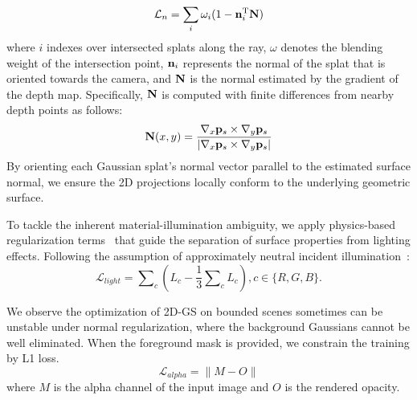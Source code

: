 \begin{equation}
\mathcal{L}_{n} = \sum_{i} \omega_i (1-\bn_i^\mathrm{T}\bN)
\vspace{-1ex}
\end{equation}
where $i$ indexes over intersected splats along the ray, $\omega$ denotes the blending weight of the intersection point, $\mathbf{n}_i$ represents the normal of the splat that is oriented towards the camera, and $\mathbf{N}$ is the normal estimated by the gradient of the depth map. Specifically, $\mathbf{N}$ is computed with finite differences from nearby depth points as follows:
\begin{equation}
\mathbf{N}(x,y) = \frac{\nabla_x \mathbf{p}_s \times \nabla_y \mathbf{p}_s}{|\nabla_x \mathbf{p}_s \times \nabla_y \mathbf{p}_s|}
\label{eq:normal_depth}
\end{equation} 
By orienting each Gaussian splat's normal vector parallel to the estimated surface normal, we ensure the 2D projections locally conform to the underlying geometric surface. 


To tackle the inherent material-illumination ambiguity, we apply physics-based regularization terms~\cite{gao2023relightable} that guide the separation of surface properties from lighting effects. Following the assumption of approximately neutral incident illumination~\cite{liu2023nero}:
\begin{equation}
\label{eq:reg_light}
    \mathcal{L}_{light} = \sum\nolimits_{c}(L_{c} - \frac{1}{3}\sum\nolimits_{c}L_{c}), c\in\{R,G,B\}.
\end{equation}

We observe the optimization of 2D-GS on bounded scenes sometimes can be unstable under normal regularization, where the background Gaussians cannot be well eliminated. When the foreground mask is provided, we constrain the training by L1 loss. 
\begin{equation}
    \mathcal{L}_{alpha} = \| M - O\|
\end{equation}
where $M$ is the alpha channel of the input image and $O$ is the rendered opacity. 

